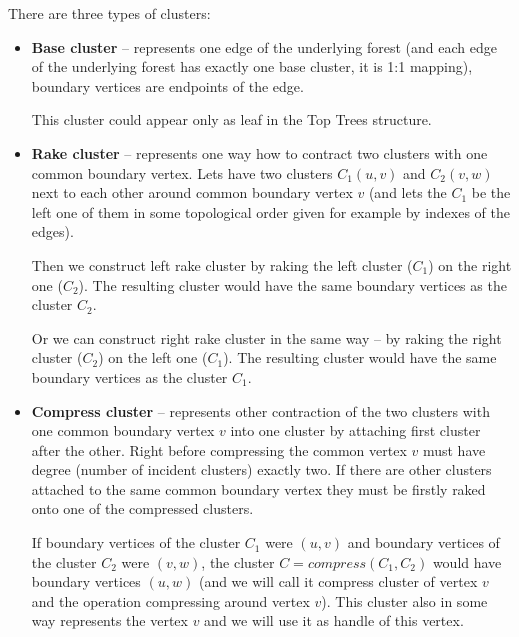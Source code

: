 There are three types of clusters:

\begin{itemize}

\item {\bf Base cluster} -- represents one edge of the underlying forest (and
each edge of the underlying forest has exactly one base cluster, it is 1:1 mapping),
boundary vertices are endpoints of the edge.

This cluster could appear only as leaf in the Top Trees structure.

\item {\bf Rake cluster} -- represents one way how to contract two clusters
with one common boundary vertex. Lets have two clusters $C_1(u,v)$ and
$C_2(v,w)$ next to each other around common boundary vertex $v$ (and lets the
$C_1$ be the left one of them in some topological order given for example by
indexes of the edges).

Then we construct {\I left rake cluster} by {\I raking} the left cluster ($C_1$)
on the right one ($C_2$). The resulting cluster would have the same boundary
vertices as the cluster $C_2$.

Or we can construct {\I right rake cluster} in the same way -- by {\I raking}
the right cluster ($C_2$) on the left one ($C_1$). The resulting cluster would
have the same boundary vertices as the cluster $C_1$.


\item{\bf Compress cluster} -- represents other contraction of the two clusters
with one common boundary vertex $v$ into one cluster by attaching first cluster
after the other. Right before compressing the common vertex $v$ must have degree
(number of incident clusters) exactly two. If there are other clusters attached
to the same common boundary vertex they must be firstly {\I raked} onto one of
the compressed clusters.

If boundary vertices of the cluster $C_1$ were $(u,v)$ and boundary vertices
of the cluster $C_2$ were $(v,w)$, the cluster $C=compress(C_1,C_2)$ would have
boundary vertices $(u,w)$ (and we will call it {\I compress cluster
of vertex $v$} and the operation {\I compressing around vertex $v$}).
This cluster also in some way represents the vertex $v$ and we will use it as
{\I handle} of this vertex.


\end{itemize}

